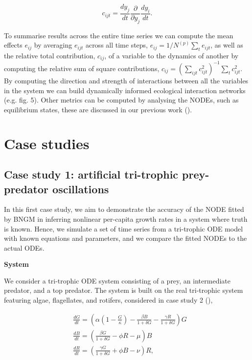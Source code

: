 \documentclass[11pt, oneside]{article}
\begin{document}
\vspace{-0.5cm}
\begin{equation}
    c_{ijt} = \frac{dy_j}{dt} \frac{\partial}{\partial y_j} \frac{dy_i}{dt}.
\end{equation}

To summarise results across the entire time series we can compute the mean effects $e_{ij}$ by averaging $e_{ijt}$ across all time steps, $e_{ij} = 1/N^{(p)} \sum_t e_{ijt}$, as well as the relative total contribution, $c_{ij}$, of a variable to the dynamics of another by computing the relative sum of square contributions, $c_{ij} = \left( \sum_{ijt} c_{ijt}^{2} \right)^{-1} \sum_t c_{ijt}^2$. 
By computing the direction and strength of interactions between all the variables in the system we can build dynamically informed ecological interaction networks (e.g. fig. 5).
Other metrics can be computed by analysing the NODEs, such as equilibrium states, these are discussed in our previous work (\cite{Bonnaffe2021a}). 

\section{Case studies}

\subsection{Case study 1: artificial tri-trophic prey-predator oscillations}

In this first case study, we aim to demonstrate the accuracy of the NODE fitted by BNGM in inferring nonlinear per-capita growth rates in a system where truth is known.
Hence, we simulate a set of time series from a tri-trophic ODE model with known equations and parameters, and we compare the fitted NODEs to the actual ODEs.

\textbf{System}

We consider a tri-trophic ODE system consisting of a prey, an intermediate predator, and a top predator.
The system is built on the real tri-trophic system featuring algae, flagellates, and rotifers, considered in case study 2 (\cite{Hiltunen2013}),

\vspace{-0.5cm}
\begin{equation} \begin{aligned}
    & \frac{dG}{dt} = \left( \alpha \left(1-\frac{G}{\kappa}\right) - \frac{\beta B}{1+\delta G} - \frac{\gamma R}{1+\delta G} \right) G\\
    & \frac{dB}{dt} = \left( \frac{\beta G}{1+\delta G} - \phi R - \mu \right) B \\
	& \frac{dR}{dt} = \left( \frac{\gamma G}{1+\delta G} + \phi B - \nu \right) R,
\end{aligned} \end{equation}
\end{document}
